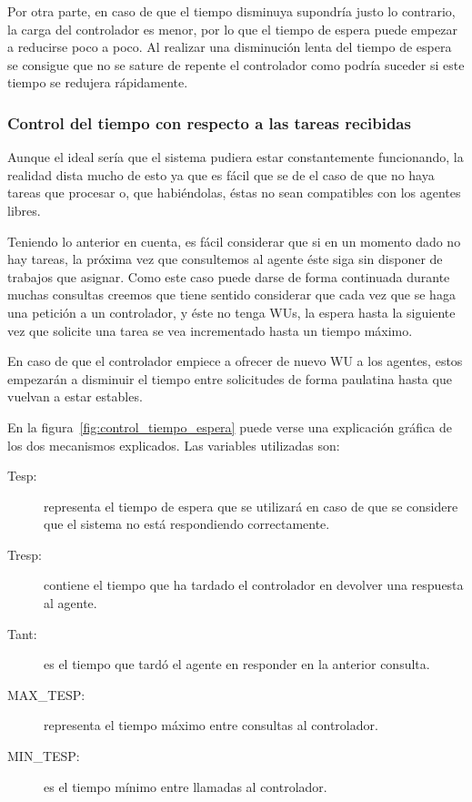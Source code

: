 Por otra parte, en caso de que el tiempo disminuya supondría justo lo contrario, la carga del controlador es menor, por lo que el tiempo de espera puede empezar a reducirse poco a poco. Al realizar una disminución lenta del tiempo de espera se consigue que no se sature de repente el controlador como podría suceder si este tiempo se redujera rápidamente.

\subsubsection{Control del tiempo con respecto a las tareas recibidas}

Aunque el ideal sería que el sistema pudiera estar constantemente funcionando, la realidad dista mucho de esto ya que es fácil que se de el caso de que no haya tareas que procesar o, que habiéndolas, éstas no sean compatibles con los agentes libres.

Teniendo lo anterior en cuenta, es fácil considerar que si en un momento dado no hay tareas, la próxima vez que consultemos al agente éste siga sin disponer de trabajos que asignar. Como este caso puede darse de forma continuada durante muchas consultas creemos que tiene sentido considerar que cada vez que se haga una petición a un controlador, y éste no tenga WUs, la espera hasta la siguiente vez que solicite una tarea se vea incrementado hasta un tiempo máximo. 

En caso de que el controlador empiece a ofrecer de nuevo WU a los agentes, estos empezarán a disminuir el tiempo entre solicitudes de forma paulatina hasta que vuelvan a estar estables.

En la figura~\ref{fig:control_tiempo_espera} puede verse una explicación gráfica de los dos mecanismos explicados. Las variables utilizadas son:
\begin{description}
	\item[Tesp:] representa el tiempo de espera que se utilizará en caso de que se considere que el sistema no está respondiendo correctamente.
	
	\item[Tresp:] contiene el tiempo que ha tardado el controlador en devolver una respuesta al agente.
	
	\item[Tant:] es el tiempo que tardó el agente en responder en la anterior consulta.
	
	\item[MAX\_TESP:] representa el tiempo máximo entre consultas al controlador.
	
	\item[MIN\_TESP:] es el tiempo mínimo entre llamadas al controlador.
\end{description}

